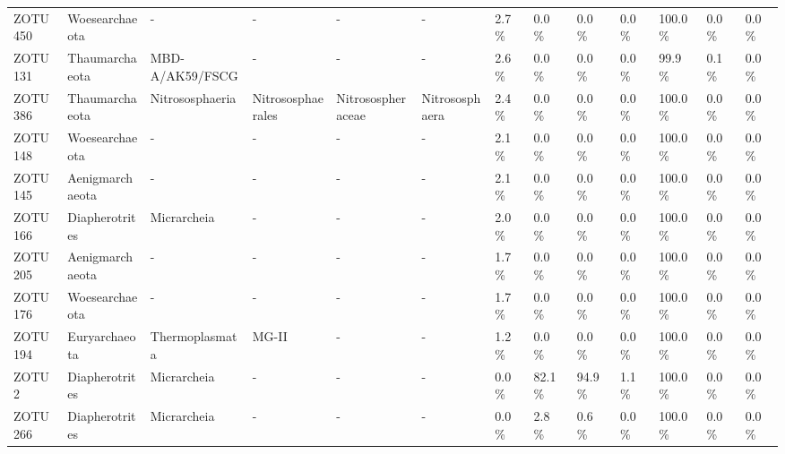 \begin{table}
\begin{adjustbox}{max width=0.8\textwidth, max totalheight=0.85\textheight, keepaspectratio}
\begin{tabular}{llllllllll||lll}
ZOTU450 & Woesearchaeota & - & - & - & - & \SI{2.7}{\percent} & \SI{0.0}{\percent} & \SI{0.0}{\percent} & \SI{0.0}{\percent} & \SI{100.0}{\percent} & \SI{0.0}{\percent} & \SI{0.0}{\percent} \\
ZOTU131 & Thaumarchaeota & MBD-A/AK59/FSCG & - & - & - & \SI{2.6}{\percent} & \SI{0.0}{\percent} & \SI{0.0}{\percent} & \SI{0.0}{\percent} & \SI{99.9}{\percent} & \SI{0.1}{\percent} & \SI{0.0}{\percent} \\
ZOTU386 & Thaumarchaeota & Nitrososphaeria & Nitrososphaerales & Nitrosospheraceae & Nitrososphaera & \SI{2.4}{\percent} & \SI{0.0}{\percent} & \SI{0.0}{\percent} & \SI{0.0}{\percent} & \SI{100.0}{\percent} & \SI{0.0}{\percent} & \SI{0.0}{\percent} \\
ZOTU148 & Woesearchaeota & - & - & - & - & \SI{2.1}{\percent} & \SI{0.0}{\percent} & \SI{0.0}{\percent} & \SI{0.0}{\percent} & \SI{100.0}{\percent} & \SI{0.0}{\percent} & \SI{0.0}{\percent} \\
ZOTU145 & Aenigmarchaeota & - & - & - & - & \SI{2.1}{\percent} & \SI{0.0}{\percent} & \SI{0.0}{\percent} & \SI{0.0}{\percent} & \SI{100.0}{\percent} & \SI{0.0}{\percent} & \SI{0.0}{\percent} \\
ZOTU166 & Diapherotrites & Micrarcheia & - & - & - & \SI{2.0}{\percent} & \SI{0.0}{\percent} & \SI{0.0}{\percent} & \SI{0.0}{\percent} & \SI{100.0}{\percent} & \SI{0.0}{\percent} & \SI{0.0}{\percent} \\
ZOTU205 & Aenigmarchaeota & - & - & - & - & \SI{1.7}{\percent} & \SI{0.0}{\percent} & \SI{0.0}{\percent} & \SI{0.0}{\percent} & \SI{100.0}{\percent} & \SI{0.0}{\percent} & \SI{0.0}{\percent} \\
ZOTU176 & Woesearchaeota & - & - & - & - & \SI{1.7}{\percent} & \SI{0.0}{\percent} & \SI{0.0}{\percent} & \SI{0.0}{\percent} & \SI{100.0}{\percent} & \SI{0.0}{\percent} & \SI{0.0}{\percent} \\
ZOTU194 & Euryarchaeota & Thermoplasmata & MG-II & - & - & \SI{1.2}{\percent} & \SI{0.0}{\percent} & \SI{0.0}{\percent} & \SI{0.0}{\percent} & \SI{100.0}{\percent} & \SI{0.0}{\percent} & \SI{0.0}{\percent} \\
ZOTU2 & Diapherotrites & Micrarcheia & - & - & - & \SI{0.0}{\percent} & \SI{82.1}{\percent} & \SI{94.9}{\percent} & \SI{1.1}{\percent} & \SI{100.0}{\percent} & \SI{0.0}{\percent} & \SI{0.0}{\percent} \\
ZOTU266 & Diapherotrites & Micrarcheia & - & - & - & \SI{0.0}{\percent} & \SI{2.8}{\percent} & \SI{0.6}{\percent} & \SI{0.0}{\percent} & \SI{100.0}{\percent} & \SI{0.0}{\percent} & \SI{0.0}{\percent} \\

\end{tabular}
\end{adjustbox}
\end{table}
